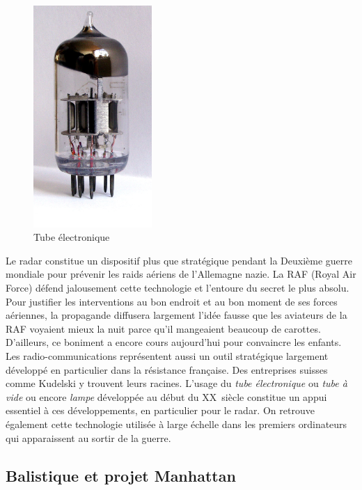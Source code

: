 \documentclass[a4paper,11pt]{book}
\begin{document}
\begin{figure} 
    \centering
    \includegraphics[width=0.4\textwidth]{media/machines/tube.jpeg}
    \caption{Tube électronique}
\end{figure}

Le radar constitue un dispositif plus que stratégique pendant la Deuxième guerre mondiale pour prévenir les raids aériens de l'Allemagne nazie. La RAF (Royal Air Force) défend jalousement cette technologie et l'entoure du secret le plus absolu. Pour justifier les interventions au bon endroit et au bon moment de ses forces aériennes, la propagande diffusera largement l'idée fausse que les aviateurs de la RAF voyaient mieux la nuit parce qu'il mangeaient beaucoup de carottes. D'ailleurs, ce boniment a encore cours aujourd'hui pour convaincre les enfants.
Les radio-communications représentent aussi un outil stratégique largement développé en particulier dans la résistance française. Des entreprises suisses comme Kudelski y trouvent leurs racines.
L'usage du \textit{tube électronique} ou \textit{tube à vide} ou encore \textit{lampe} développée au début du \textsc{XX}\ieme~siècle constitue un appui essentiel à ces développements, en particulier pour le radar. On retrouve également cette technologie utilisée à large échelle dans les premiers ordinateurs qui apparaissent au sortir de la guerre.

\subsection{Balistique et projet Manhattan}
\end{document}
